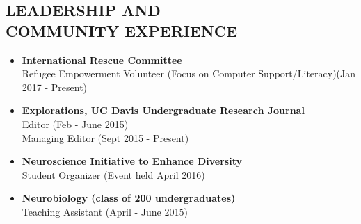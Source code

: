 \documentclass[line,margin,10pt]{res}
\begin{document}
\begin{resume}
 \section{LEADERSHIP AND\\ COMMUNITY EXPERIENCE}
 \begin{itemize}[leftmargin=-2pt]\itemsep -2pt
 \item[]\textbf{International Rescue Committee}\\Refugee Empowerment Volunteer (Focus on Computer Support/Literacy)\hfill (Jan 2017 - Present)
 \item[] \textbf{Explorations, UC Davis Undergraduate Research Journal} \\Editor \hfill(Feb - June 2015)\\ Managing Editor \hfill (Sept 2015 - Present)
\item[] \textbf{Neuroscience Initiative to Enhance Diversity} \\ Student Organizer \hfill (Event held April 2016)
\item[] \textbf {Neurobiology (class of 200 undergraduates)} \\Teaching Assistant \hfill (April - June 2015)







\end{itemize}
\end{resume}
\end{document}
